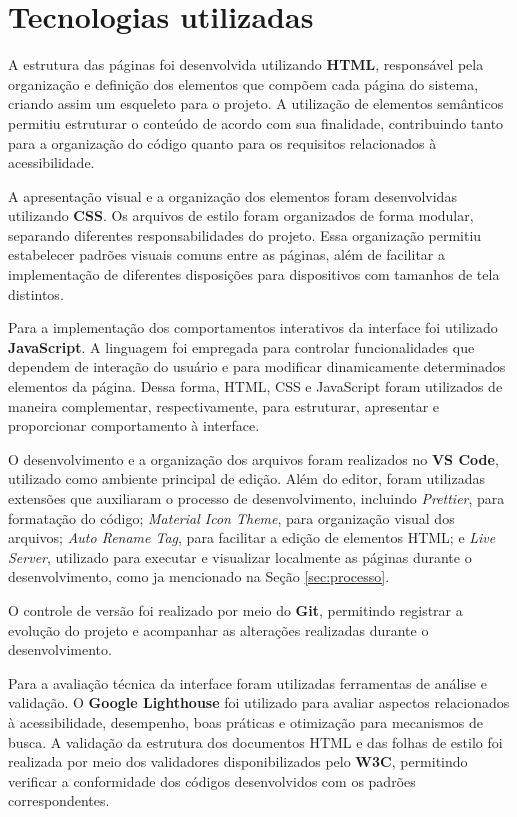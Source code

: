 \vspace{5mm}
\section{Tecnologias utilizadas}



A estrutura das páginas foi desenvolvida utilizando \textbf{HTML}, responsável pela organização e definição dos elementos que compõem cada página do sistema, criando assim um esqueleto para o projeto. A utilização de elementos semânticos permitiu estruturar o conteúdo de acordo com sua finalidade, contribuindo tanto para a organização do código quanto para os requisitos relacionados à acessibilidade.

A apresentação visual e a organização dos elementos foram desenvolvidas utilizando \textbf{CSS}. Os arquivos de estilo foram organizados de forma modular, separando diferentes responsabilidades do projeto. Essa organização permitiu estabelecer padrões visuais comuns entre as páginas, além de facilitar a implementação de diferentes disposições para dispositivos com tamanhos de tela distintos.

Para a implementação dos comportamentos interativos da interface foi utilizado \textbf{JavaScript}. A linguagem foi empregada para controlar funcionalidades que dependem de interação do usuário e para modificar dinamicamente determinados elementos da página. Dessa forma, HTML, CSS e JavaScript foram utilizados de maneira complementar, respectivamente, para estruturar, apresentar e proporcionar comportamento à interface.

O desenvolvimento e a organização dos arquivos foram realizados no \textbf{VS Code}, utilizado como ambiente principal de edição. Além do editor, foram utilizadas extensões que auxiliaram o processo de desenvolvimento, incluindo \textit{Prettier}, para formatação do código; \textit{Material Icon Theme}, para organização visual dos arquivos; \textit{Auto Rename Tag}, para facilitar a edição de elementos HTML; e \textit{Live Server}, utilizado para executar e visualizar localmente as páginas durante o desenvolvimento, como ja mencionado na Seção \ref{sec:processo}.

O controle de versão foi realizado por meio do \textbf{Git}, permitindo registrar a evolução do projeto e acompanhar as alterações realizadas durante o desenvolvimento. 

Para a avaliação técnica da interface foram utilizadas ferramentas de análise e validação. O \textbf{Google Lighthouse} foi utilizado para avaliar aspectos relacionados à acessibilidade, desempenho, boas práticas e otimização para mecanismos de busca. A validação da estrutura dos documentos HTML e das folhas de estilo foi realizada por meio dos validadores disponibilizados pelo \textbf{W3C}, permitindo verificar a conformidade dos códigos desenvolvidos com os padrões correspondentes.
